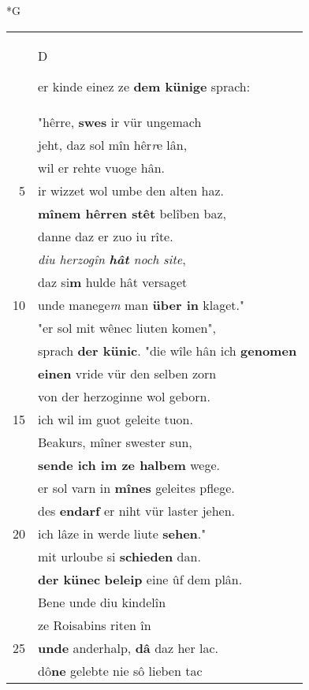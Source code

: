 \documentclass[8pt,a4paper,notitlepage]{article}
\begin{document}
\newpage
\begin{table}[ht]
\begin{minipage}[t]{0.5\linewidth}
\small
\begin{center}*G
\end{center}
\begin{tabular}{rl}
 & \begin{large}D\end{large}er kinde einez ze \textbf{dem künige} sprach:\\ 
 & "hêrre, \textbf{swes} ir vür ungemach\\ 
 & jeht, daz sol mîn hêr\textit{r}e lân,\\ 
 & wil er rehte vuoge hân.\\ 
5 & ir wizzet wol umbe den alten haz.\\ 
 & \textbf{mînem hêrren stêt} belîben baz,\\ 
 & danne daz er zuo iu rîte.\\ 
 & \textit{diu herzogîn \textbf{hât} noch site},\\ 
 & daz si\textbf{m} hulde hât versaget\\ 
10 & unde manege\textit{m} man \textbf{über in} klaget."\\ 
 & "er sol mit wênec liuten komen",\\ 
 & sprach \textbf{der künic}. "die wîle hân ich \textbf{genomen}\\ 
 & \textbf{einen} vride vür den selben zorn\\ 
 & von der herzoginne wol geborn.\\ 
15 & ich wil im guot geleite tuon.\\ 
 & Beakurs, mîner swester sun,\\ 
 & \textbf{sende ich im ze halbem} wege.\\ 
 & er sol varn in \textbf{mînes} geleites pflege.\\ 
 & des \textbf{en}\textbf{darf} er niht vür laster jehen.\\ 
20 & ich lâze in werde liute \textbf{sehen}."\\ 
 & mit urloube si \textbf{schieden} dan.\\ 
 & \textbf{der künec} \textbf{beleip} eine ûf dem plân.\\ 
 & Bene unde diu kindelîn\\ 
 & ze Roisabins riten în\\ 
25 & \textbf{unde} anderhalp, \textbf{dâ} daz her lac.\\ 
 & dô\textbf{ne} gelebte nie sô lieben tac\\ 

\end{tabular}
\end{minipage}
\end{table}
\end{document}
